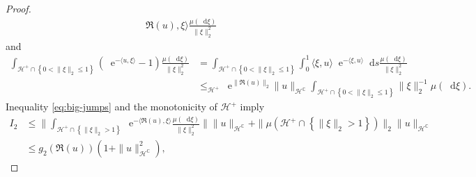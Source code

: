 \documentclass[10pt,a4paper]{amsart}
\newcommand*\D{\mathop{}\!\mathrm{d}}
\newcommand*\E{\mathop{}\!\mathrm{e}}
\newcommand{\cH}{\mathcal{H}}
\newcommand{\cHplus}{\cH^{+}}
\newcommand{\norm}[1]{\|#1\|}
\newcommand{\set}[1]{\left\{ #1\right\}}
\begin{document}
\begin{proof}
\begin{align}
{    \Re(u),\xi\rangle} \frac{\mu(\D\xi)}{\norm{\xi}_2^{2}}
  \end{align}
  and 
  \begin{align}\label{eq:small-jumps}
    \int_{\cHplus\cap\set{0<\norm{\xi}_2\leq 1}} (\E^{-\langle
    u,\xi\rangle} -1)\frac{\mu(\D\xi)}{\norm{\xi}_2^{2}}%
                                                                               &=
                                                    \int_{\cHplus\cap\set{0<\norm{\xi}_2\leq
                                                    1}}\int_{0}^{1}\langle
                                                    \xi,u\rangle \E^{-\langle
                                                    \xi,u\rangle}\D s\frac{\mu(\D\xi)}{\norm{\xi}_2^{2}}\nonumber\\ 
    &\leq_{\cHplus} \E^{\norm{\Re(u)}_2}\norm{u}_{\cH^\mathbb{C}}\int_{\cHplus\cap\set{0<\norm{\xi}_2\leq 1}}\norm{\xi}_2^{-1}\mu(\D\xi).
  \end{align}
  Inequality \eqref{eq:big-jumps} and the monotonicity of $\cHplus$ imply 
  \begin{align*}
    I_2&\leq
                                                                                \norm{\int_{\cHplus\cap\set{\norm{\xi}_2>1}}\E^{-\langle
                                                                                \Re(u),\xi\rangle}\frac{\mu(\D\xi)}{\norm{\xi}_2^{2}}}\norm{u}_{\cH^{\mathbb{C}}}
    +\norm{\mu(\cHplus\cap\set{\norm{\xi}_2>1})}_2\norm{u}_{\cH^{\mathbb{C}}}\\
                                                                              &\leq g_{2}(\Re(u))(1+\norm{u}_{\cH^{\mathbb{C}}}^{2}),

\end{align*}
\end{proof}
\end{document}
